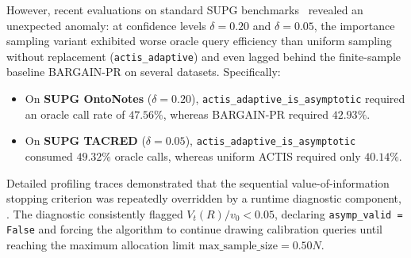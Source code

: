 \documentclass[11pt,a4paper]{article}
\begin{document}
However, recent evaluations on standard SUPG benchmarks~\cite{kang2020approximate} revealed an unexpected anomaly: at confidence levels $\delta = 0.20$ and $\delta = 0.05$, the importance sampling variant exhibited worse oracle query efficiency than uniform sampling without replacement (\texttt{actis\_adaptive}) and even lagged behind the finite-sample baseline BARGAIN-PR on several datasets. Specifically:
\begin{itemize}[leftmargin=*]
    \item On \textbf{SUPG OntoNotes} ($\delta = 0.20$), \texttt{actis\_adaptive\_is\_asymptotic} required an oracle call rate of $47.56\%$, whereas BARGAIN-PR required $42.93\%$.
    \item On \textbf{SUPG TACRED} ($\delta = 0.05$), \texttt{actis\_adaptive\_is\_asymptotic} consumed $49.32\%$ oracle calls, whereas uniform ACTIS required only $40.14\%$.
\end{itemize}
Detailed profiling traces demonstrated that the sequential value-of-information stopping criterion was repeatedly overridden by a runtime diagnostic component, . The diagnostic consistently flagged $V_t(R) / v_0 < 0.05$, declaring \texttt{asymp\_valid = False} and forcing the algorithm to continue drawing calibration queries until reaching the maximum allocation limit $\text{max\_sample\_size} = 0.50 N$.
\end{document}
